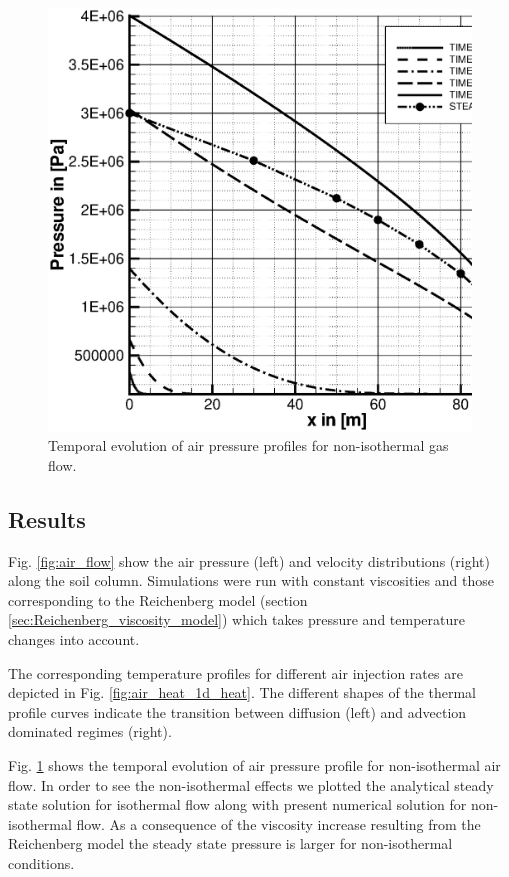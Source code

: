 \begin{figure}[htb!]
\begin{center}
\footnotesize
\includegraphics[width=0.5\columnwidth]{PART_II/G/non_isothermal_flow.eps}  %
\caption{Temporal evolution of air pressure profiles for non-isothermal gas flow.}
\label{fig:visco8}
\end{center}
\end{figure}

\subsection{Results}
Fig. \ref{fig:air_flow} show the air pressure (left) and velocity distributions (right) along the soil column. Simulations were run with constant viscosities and those corresponding to the Reichenberg model (section \ref{sec:Reichenberg_viscosity_model}) which takes pressure and temperature changes into account.


The corresponding temperature profiles for different air injection rates are depicted in Fig. \ref{fig:air_heat_1d_heat}. The different shapes of the thermal profile curves indicate the transition between diffusion (left) and advection dominated regimes (right).


Fig. \ref{fig:visco8} shows the temporal evolution of air pressure profile for non-isothermal air flow. In order to see the non-isothermal effects we plotted the analytical steady state solution for isothermal flow along with present numerical solution for non-isothermal flow. As a consequence of the viscosity increase resulting from the Reichenberg model the steady state pressure is larger for non-isothermal conditions.
